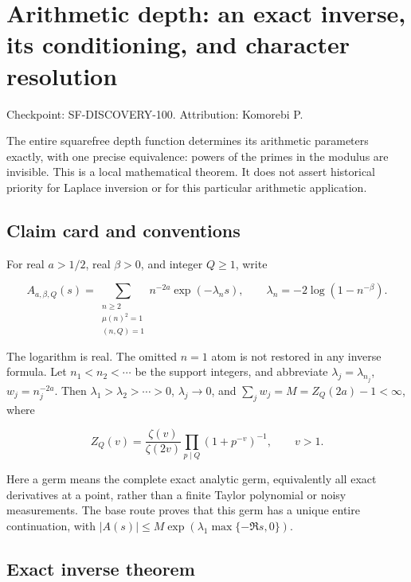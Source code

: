 \hypertarget{arithmetic-depth-an-exact-inverse-its-conditioning-and-character-resolution}{%
\section{Arithmetic depth: an exact inverse, its conditioning, and
character
resolution}\label{arithmetic-depth-an-exact-inverse-its-conditioning-and-character-resolution}}

Checkpoint: SF-DISCOVERY-100. Attribution: Komorebi P.

The entire squarefree depth function determines its arithmetic
parameters exactly, with one precise equivalence: powers of the primes
in the modulus are invisible. This is a local mathematical theorem. It
does not assert historical priority for Laplace inversion or for this
particular arithmetic application.

\hypertarget{claim-card-and-conventions}{%
\subsection{Claim card and
conventions}\label{claim-card-and-conventions}}

For real \(a>1/2\), real \(\beta>0\), and integer \(Q\ge1\), write

\[
 A_{a,\beta,Q}(s)=\sum_{\substack{n\ge2\\ \mu(n)^2=1\\ (n,Q)=1}}
 n^{-2a}\exp(-\lambda_n s),\qquad
 \lambda_n=-2\log(1-n^{-\beta}).
\]

The logarithm is real. The omitted \(n=1\) atom is not restored in any
inverse formula. Let \(n_1<n_2<\cdots\) be the support integers, and
abbreviate \(\lambda_j=\lambda_{n_j}\), \(w_j=n_j^{-2a}\). Then
\(\lambda_1>\lambda_2>\cdots>0\), \(\lambda_j\to0\), and
\(\sum_jw_j=M=Z_Q(2a)-1<\infty\), where

\[
 Z_Q(v)=\frac{\zeta(v)}{\zeta(2v)}
          \prod_{p\mid Q}(1+p^{-v})^{-1},\qquad v>1.
\]

Here a germ means the complete exact analytic germ, equivalently all
exact derivatives at a point, rather than a finite Taylor polynomial or
noisy measurements. The base route proves that this germ has a unique
entire continuation, with
\(|A(s)|\le M\exp(\lambda_1\max\{-\Re s,0\})\).

\hypertarget{exact-inverse-theorem}{%
\subsection{Exact inverse theorem}\label{exact-inverse-theorem}}

